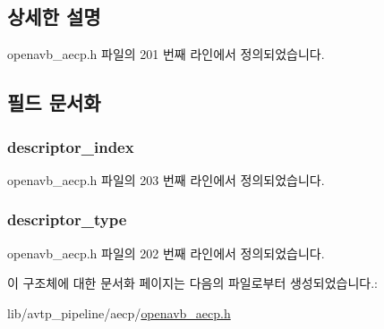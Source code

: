 \subsection{상세한 설명}


openavb\+\_\+aecp.\+h 파일의 201 번째 라인에서 정의되었습니다.



\subsection{필드 문서화}
\subsubsection[{\texorpdfstring{descriptor\+\_\+index}{descriptor_index}}]{ descriptor\+\_\+index}\hypertarget{structopenavb__aecp__command__data__get__clock__source__t_ab26fb363c24b9a2a4391f9171c981b08}{}\label{structopenavb__aecp__command__data__get__clock__source__t_ab26fb363c24b9a2a4391f9171c981b08}


openavb\+\_\+aecp.\+h 파일의 203 번째 라인에서 정의되었습니다.

\subsubsection[{\texorpdfstring{descriptor\+\_\+type}{descriptor_type}}]{ descriptor\+\_\+type}\hypertarget{structopenavb__aecp__command__data__get__clock__source__t_a1e231d7874aada5925b29affc76782cc}{}\label{structopenavb__aecp__command__data__get__clock__source__t_a1e231d7874aada5925b29affc76782cc}


openavb\+\_\+aecp.\+h 파일의 202 번째 라인에서 정의되었습니다.



이 구조체에 대한 문서화 페이지는 다음의 파일로부터 생성되었습니다.\+:\begin{DoxyCompactItemize}
\item 
lib/avtp\+\_\+pipeline/aecp/\hyperlink{openavb__aecp_8h}{openavb\+\_\+aecp.\+h}\end{DoxyCompactItemize}
